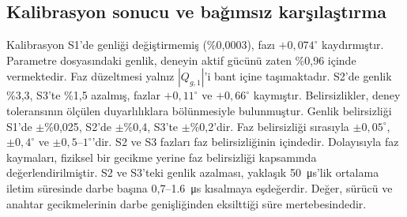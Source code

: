 \subsection{Kalibrasyon sonucu ve bağımsız karşılaştırma}

Kalibrasyon S1'de genliği değiştirmemiş (\%0,0003), fazı $+0{,}074^{\circ}$ kaydırmıştır. Parametre dosyasındaki genlik, deneyin aktif gücünü zaten \%0,96 içinde vermektedir. Faz düzeltmesi yalnız $|Q_{g,1}|$'i bant içine taşımaktadır. S2'de genlik \%3,3, S3'te \%1,5 azalmış, fazlar $+0{,}11^{\circ}$ ve $+0{,}66^{\circ}$ kaymıştır. Belirsizlikler, deney toleransının ölçülen duyarlılıklara bölünmesiyle bulunmuştur. Genlik belirsizliği S1'de $\pm$\%0,025, S2'de $\pm$\%0,4, S3'te $\pm$\%0,2'dir. Faz belirsizliği sırasıyla $\pm0{,}05^{\circ}$, $\pm0{,}4^{\circ}$ ve $\pm0{,}5$--$1^{\circ}$'dir. S2 ve S3 fazları faz belirsizliğinin içindedir. Dolayısıyla faz kaymaları, fiziksel bir gecikme yerine faz belirsizliği kapsamında değerlendirilmiştir. S2 ve S3'teki genlik azalması, yaklaşık \SI{50}{\micro\second}'lik ortalama iletim süresinde darbe başına 0,7--\SI{1.6}{\micro\second} kısalmaya eşdeğerdir. Değer, sürücü ve anahtar gecikmelerinin darbe genişliğinden eksilttiği süre mertebesindedir.

